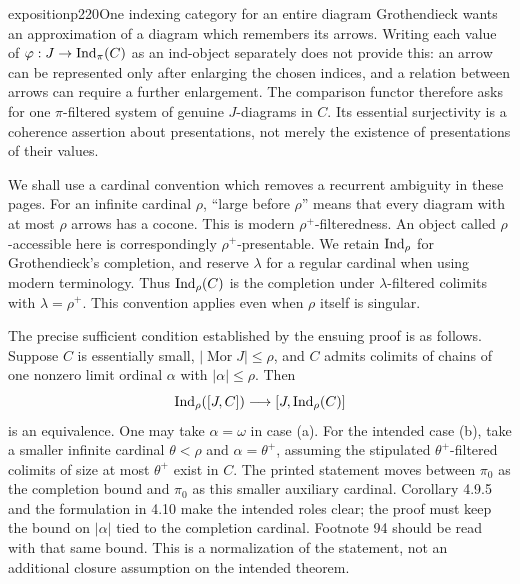 \begin{dcomment}{exposition}{p220}{One indexing category for an entire diagram}
Grothendieck wants an approximation of a diagram which remembers its arrows.  Writing each value of $\varphi:J\to\mathrm{Ind}_\pi(C)$ as an ind-object separately does not provide this: an arrow can be represented only after enlarging the chosen indices, and a relation between arrows can require a further enlargement.  The comparison functor therefore asks for one $\pi$-filtered system of genuine $J$-diagrams in $C$.  Its essential surjectivity is a coherence assertion about presentations, not merely the existence of presentations of their values.

We shall use a cardinal convention which removes a recurrent ambiguity in these pages.  For an infinite cardinal $\rho$, ``large before $\rho$'' means that every diagram with at most $\rho$ arrows has a cocone.  This is modern $\rho^+$-filteredness.  An object called $\rho$-accessible here is correspondingly $\rho^+$-presentable.  We retain $\mathrm{Ind}_\rho$ for Grothendieck's completion, and reserve $\lambda$ for a regular cardinal when using modern terminology.  Thus $\mathrm{Ind}_\rho(C)$ is the completion under $\lambda$-filtered colimits with $\lambda=\rho^+$.  This convention applies even when $\rho$ itself is singular.

The precise sufficient condition established by the ensuing proof is as follows.  Suppose $C$ is essentially small, $|\operatorname{Mor}J|\leq\rho$, and $C$ admits colimits of chains of one nonzero limit ordinal $\alpha$ with $|\alpha|\leq\rho$.  Then
\[
 \mathrm{Ind}_\rho([J,C])\longrightarrow[J,\mathrm{Ind}_\rho(C)]
\]
is an equivalence.  One may take $\alpha=\omega$ in case (a).  For the intended case (b), take a smaller infinite cardinal $\theta<\rho$ and $\alpha=\theta^+$, assuming the stipulated $\theta^+$-filtered colimits of size at most $\theta^+$ exist in $C$.  The printed statement moves between $\pi_0$ as the completion bound and $\pi_0$ as this smaller auxiliary cardinal.  Corollary 4.9.5 and the formulation in 4.10 make the intended roles clear; the proof must keep the bound on $|\alpha|$ tied to the completion cardinal.  Footnote 94 should be read with that same bound.  This is a normalization of the statement, not an additional closure assumption on the intended theorem.


\end{dcomment}
